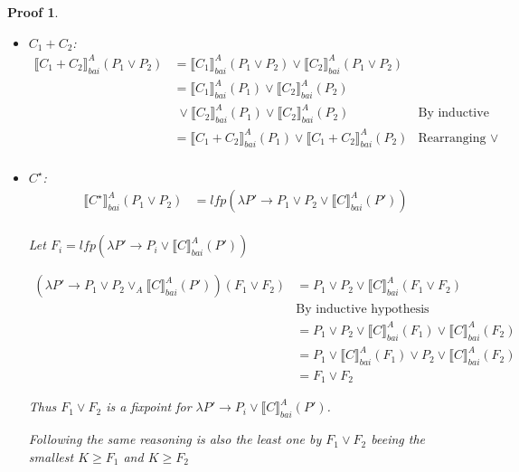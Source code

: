\documentclass{article}
\newtheorem{proofs}{Proof}
\def\rr{\rightarrow}
\newcommand*{\sem}[1]{
    \llbracket #1 \rrbracket
}
\newcommand{\bca}[2]{
    #2_{bai}^{#1}
}
\newcommand{\bsem}[2][A]{
    \bca{#1}{\sem{#2}}
}
\def\rr{\rightarrow}
\begin{document}
\begin{proofs}
\begin{itemize}
            \item $C_1 + C_2$:
                \begin{align*}
                    \bsem{C_1 + C_2}(P_1 \lor P_2)
                        &= \bsem{C_1}(P_1 \lor P_2) \lor \bsem{C_2}(P_1 \lor P_2) \\
                        &=\bsem{C_1}(P_1) \lor \bsem{C_2}(P_2) \\
                            & \; \lor \bsem{C_2}(P_1) \lor \bsem{C_2}(P_2)
                        &\text{By inductive hypothesis} \\
                        &= \bsem{C_1 + C_2}(P_1) \lor \bsem{C_1 + C_2}(P_2)
                        &\text{Rearranging $\lor$} \\
                \end{align*}

            \item $C^\star$:
                \begin{align*}
                    \bsem{C^\star}(P_1 \lor P_2)
                        &= lfp(\lambda P' \rr P_1 \lor P_2 \lor \bsem{C}(P')) \\
                \end{align*}

                Let $F_i = lfp(\lambda P' \rr P_i \lor \bsem{C}(P'))$


                \begin{align*}
                    (\lambda P' \rr P_1 \vee P_2 \vee_A \bsem{C}(P'))(F_1 \lor F_2)
                        &= P_1 \vee P_2 \vee \bsem{C}(F_1 \vee F_2) \\
                        & \text{By inductive hypothesis}  \\
                        &= P_1 \vee P_2 \vee \bsem{C}(F_1) \vee \bsem{C}(F_2) \\
                        &= P_1 \vee \bsem{C}(F_1) \vee P_2 \vee \bsem{C}(F_2) \\
                        &= F_1 \lor F_2
                \end{align*}

                Thus $F_1 \lor F_2$ is a fixpoint for 
                $\lambda P' \rr P_i \lor \bsem{C}(P')$.

                Following the same reasoning is also the least one by 
                $F_1 \lor F_2$ beeing the smallest $K \geq F_1$ and 
                $K \geq F_2$
        \end{itemize}
    \end{proofs}
\end{document}
